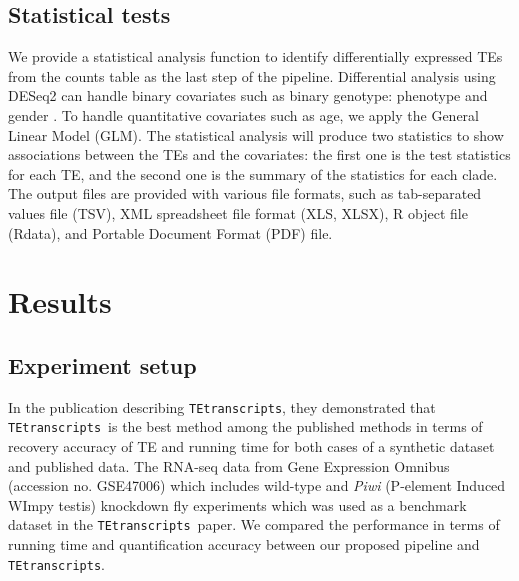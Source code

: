 \documentclass[wsdraft]{ws-procs11x85}
\newcommand{\TEtranscripts}{\texttt{TEtranscripts}}
\begin{document}
\subsection{Statistical tests}
We provide a statistical analysis function to identify differentially expressed TEs from the counts table as the last step of the pipeline. 
Differential analysis using DESeq2 can handle  binary covariates such as binary genotype: phenotype and gender \cite{love2014moderated}. To handle quantitative covariates such as age, we apply the General Linear Model (GLM)\cite{johnston1980multivariate}. The statistical analysis will produce two statistics to show associations between the TEs and the covariates:
% 
% 
% 
%
the first one is the test statistics for each TE, and the second one is the summary of the statistics for each clade. 
The output files are provided with various file formats, such as tab-separated values file (TSV), XML spreadsheet file format (XLS, XLSX), R object file (Rdata), and Portable Document Format (PDF) file.

\section{Results}

\subsection{Experiment setup}
In the publication describing \TEtranscripts, they demonstrated that \TEtranscripts~is the best method among the published methods in terms of recovery accuracy of TE and running time for both cases of a synthetic dataset and published data.\cite{jin2015tetranscripts} 
% 
%
The RNA-seq data from Gene Expression Omnibus (accession no. GSE47006)
which includes wild-type and \textit{Piwi} (P-element Induced WImpy testis) knockdown fly experiments
which was used as a benchmark dataset in the \TEtranscripts~paper.\cite{ohtani2013dmgtsf1}
% 
% 
% 
%
% 
% 
% 
%
We compared  the performance in terms of running time and quantification accuracy between
% 
% 
% 
%
%
our proposed pipeline and \TEtranscripts.
\end{document}
